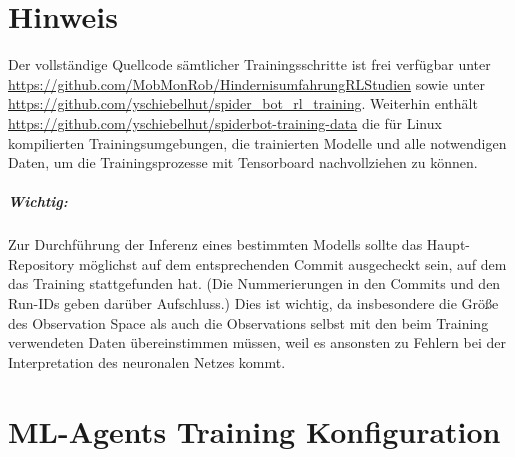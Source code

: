 \chapter{Hinweis}
Der vollständige Quellcode sämtlicher Trainingsschritte ist frei verfügbar unter \url{https://github.com/MobMonRob/HindernisumfahrungRLStudien} sowie unter \url{https://github.com/yschiebelhut/spider_bot_rl_training}.
Weiterhin enthält \url{https://github.com/yschiebelhut/spiderbot-training-data} die für Linux kompilierten Trainingsumgebungen, die trainierten Modelle und alle notwendigen Daten, um die Trainingsprozesse mit Tensorboard nachvollziehen zu können.

\paragraph{Wichtig:} Zur Durchführung der Inferenz eines bestimmten Modells sollte das Haupt-Repository möglichst auf dem entsprechenden Commit ausgecheckt sein, auf dem das Training stattgefunden hat.
(Die Nummerierungen in den Commits und den Run-IDs geben darüber Aufschluss.)
Dies ist wichtig, da insbesondere die Größe des Observation Space als auch die Observations selbst mit den beim Training verwendeten Daten übereinstimmen müssen, weil es ansonsten zu Fehlern bei der Interpretation des neuronalen Netzes kommt.


\chapter{ML-Agents Training Konfiguration}
\label{anhang:trainer-config}
\begin{figure}[H]
    
\end{figure}